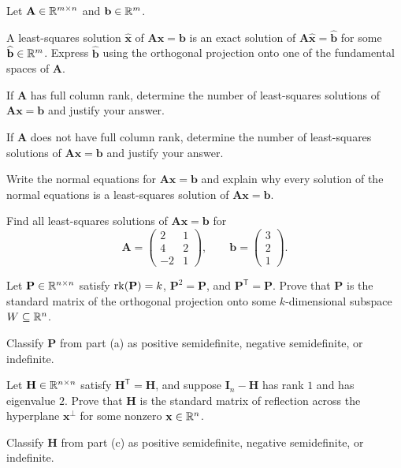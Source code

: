 \documentclass[11pt,oneside]{article}
\begin{document}
\begin{problem}
Let $\mathbf A\in\mathbb{R}^{m\times n}$ and $\mathbf b\in\mathbb{R}^m$.
\begin{problemsubparts}
\item A least-squares solution $\widehat{\mathbf x}$ of $\mathbf A\mathbf x=\mathbf b$ is an exact solution of $\mathbf A\widehat{\mathbf x}=\widehat{\mathbf b}$ for some $\widehat{\mathbf b}\in\mathbb{R}^m$. Express $\widehat{\mathbf b}$ using the orthogonal projection onto one of the fundamental spaces of $\mathbf A$.
\item If $\mathbf A$ has full column rank, determine the number of least-squares solutions of $\mathbf A\mathbf x=\mathbf b$ and justify your answer.
\item If $\mathbf A$ does not have full column rank, determine the number of least-squares solutions of $\mathbf A\mathbf x=\mathbf b$ and justify your answer.
\item Write the normal equations for $\mathbf A\mathbf x=\mathbf b$ and explain why every solution of the normal equations is a least-squares solution of $\mathbf A\mathbf x=\mathbf b$.
\item Find all least-squares solutions of $\mathbf A\mathbf x=\mathbf b$ for
\[
\mathbf A=
\begin{pmatrix}
2&1\\
4&2\\
-2&1
\end{pmatrix},
\qquad
\mathbf b=\begin{pmatrix}3\\2\\1\end{pmatrix}.
\]
\end{problemsubparts}
\end{problem}

\begin{problem}
\begin{problemsubparts}
\item Let $\mathbf P\in\mathbb{R}^{n\times n}$ satisfy $\operatorname{rk}(\mathbf P)=k$, $\mathbf P^2=\mathbf P$, and $\mathbf P^{\mathsf T}=\mathbf P$. Prove that $\mathbf P$ is the standard matrix of the orthogonal projection onto some $k$-dimensional subspace $W\subseteq\mathbb{R}^n$.
\item Classify $\mathbf P$ from part \textup{(a)} as positive semidefinite, negative semidefinite, or indefinite.
\item Let $\mathbf H\in\mathbb{R}^{n\times n}$ satisfy $\mathbf H^{\mathsf T}=\mathbf H$, and suppose $\mathbf I_n-\mathbf H$ has rank $1$ and has eigenvalue $2$. Prove that $\mathbf H$ is the standard matrix of reflection across the hyperplane $\mathbf x^\perp$ for some nonzero $\mathbf x\in\mathbb{R}^n$.
\item Classify $\mathbf H$ from part \textup{(c)} as positive semidefinite, negative semidefinite, or indefinite.
\end{problemsubparts}
\end{problem}
\end{document}
